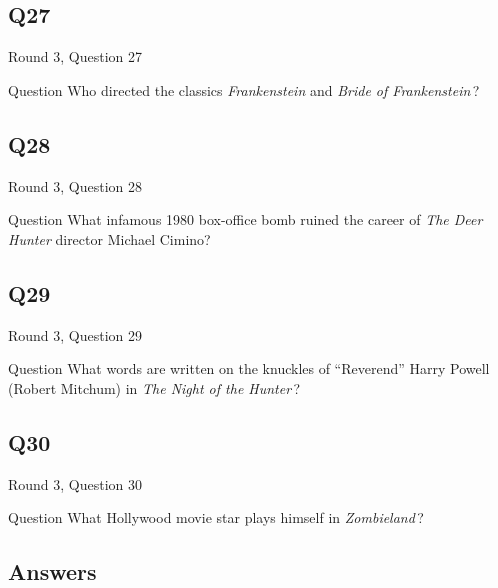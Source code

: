\documentclass[11pt]{beamer}
\begin{document}
\subsection*{Q27}
\begin{frame}[t]{Round 3, Question 27}
\vspace{2em}
\begin{block}{Question}
Who directed the classics \emph{Frankenstein} and \emph{Bride of Frankenstein}\,?
\end{block}
\end{frame}
    

\subsection*{Q28}
\begin{frame}[t]{Round 3, Question 28}
\vspace{2em}
\begin{block}{Question}
What infamous 1980 box-office bomb ruined the career of \emph{The Deer Hunter} director Michael Cimino?
\end{block}
\end{frame}
    

\subsection*{Q29}
\begin{frame}[t]{Round 3, Question 29}
\vspace{2em}
\begin{block}{Question}
What words are written on the knuckles of ``Reverend'' Harry Powell (Robert Mitchum) in \emph{The Night of the Hunter}\,?
\end{block}
\end{frame}
    

\subsection*{Q30}
\begin{frame}[t]{Round 3, Question 30}
\vspace{2em}
\begin{block}{Question}
What Hollywood movie star plays himself in \emph{Zombieland}\,?
\end{block}
\end{frame}
    
\subsection{Answers}
\end{document}
